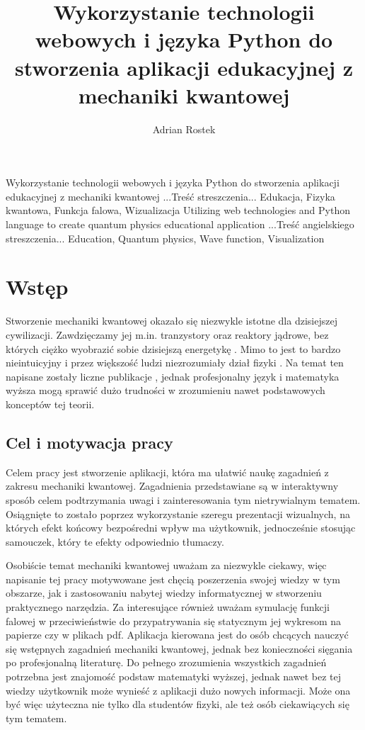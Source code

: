 \documentclass{SGGW-thesis}
\title{Wykorzystanie technologii webowych i języka Python do stworzenia aplikacji edukacyjnej z mechaniki kwantowej}
\author{Adrian Rostek}
\begin{document}
\maketitle
\statementpage
\abstractpage
{Wykorzystanie technologii webowych i języka Python do stworzenia aplikacji edukacyjnej z mechaniki kwantowej}
{...Treść streszczenia...}
{Edukacja, Fizyka kwantowa, Funkcja falowa, Wizualizacja}
{Utilizing web technologies and Python language to create quantum physics educational application}
{...Treść angielskiego streszczenia...}
{Education, Quantum physics, Wave function, Visualization}


{
  \doublespacing
  \tableofcontents
}

\startchapterfromoddpage %

\chapter{Wstęp}
Stworzenie mechaniki kwantowej okazało się niezwykle istotne dla dzisiejszej cywilizacji. Zawdzięczamy jej m.in. tranzystory oraz reaktory jądrowe, bez których ciężko wyobrazić sobie dzisiejszą energetykę \cite{nuclear-stats}. Mimo to jest to bardzo nieintuicyjny i przez większość ludzi niezrozumiały dział fizyki \cite{fiz atom}. Na temat ten napisane zostały liczne publikacje \cite{fiz atom} \cite{mechanika kwant} \cite{fiz kwant}, jednak profesjonalny język i matematyka wyższa mogą sprawić dużo trudności w zrozumieniu nawet podstawowych konceptów tej teorii.

	\section{Cel i motywacja pracy}
	Celem pracy jest stworzenie aplikacji, która ma ułatwić naukę zagadnień z zakresu mechaniki kwantowej. Zagadnienia przedstawiane są w interaktywny sposób celem podtrzymania uwagi i zainteresowania tym nietrywialnym tematem. Osiągnięte to zostało poprzez wykorzystanie szeregu prezentacji wizualnych, na których efekt końcowy bezpośredni wpływ ma użytkownik, jednocześnie stosując samouczek, który te efekty odpowiednio tłumaczy.
	
	Osobiście temat mechaniki kwantowej uważam za niezwykle ciekawy, więc napisanie tej pracy motywowane jest chęcią poszerzenia swojej wiedzy w tym obszarze, jak i zastosowaniu nabytej wiedzy informatycznej w stworzeniu praktycznego narzędzia. Za interesujące również uważam symulację funkcji falowej w przeciwieństwie do przypatrywania się statycznym jej wykresom na papierze czy w plikach pdf. Aplikacja kierowana jest do osób chcących nauczyć się wstępnych zagadnień mechaniki kwantowej, jednak bez konieczności sięgania po profesjonalną literaturę. Do pełnego zrozumienia wszystkich zagadnień potrzebna jest znajomość podstaw matematyki wyższej, jednak nawet bez tej wiedzy użytkownik może wynieść z aplikacji dużo nowych informacji. Może ona być więc użyteczna nie tylko dla studentów fizyki, ale też osób ciekawiących się tym tematem.
\end{document}
